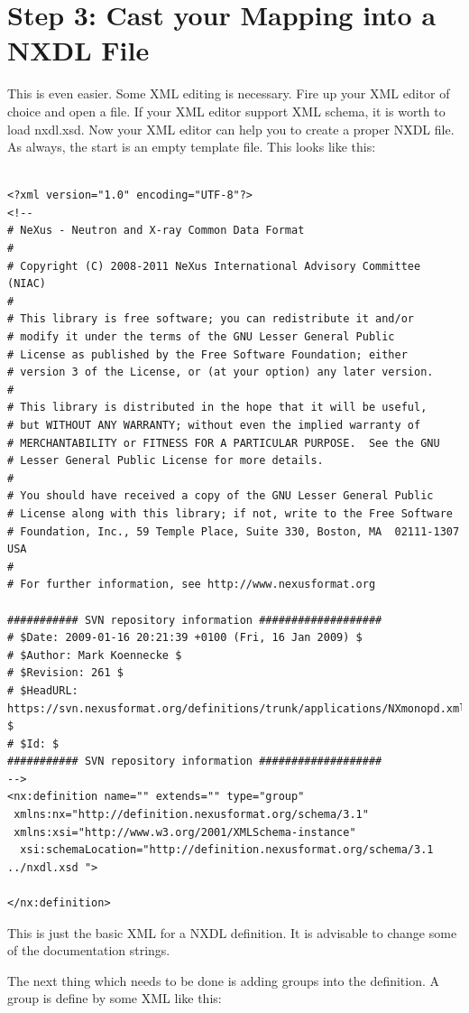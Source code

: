 \documentclass[a4paper]{article}\usepackage[dvips]{graphicx}
\begin{document}
\section{Step 3: Cast your Mapping into a NXDL File }

This is even easier. Some XML editing is necessary. Fire up your XML editor of choice and open a file. 
If your XML editor support XML schema, it is worth to load nxdl.xsd. Now your XML editor can help you to 
create a proper NXDL file. As always, the start is an empty template file. This looks like this:


\begin{verbatim}

<?xml version="1.0" encoding="UTF-8"?>
<!--
# NeXus - Neutron and X-ray Common Data Format
# 
# Copyright (C) 2008-2011 NeXus International Advisory Committee (NIAC)
# 
# This library is free software; you can redistribute it and/or
# modify it under the terms of the GNU Lesser General Public
# License as published by the Free Software Foundation; either
# version 3 of the License, or (at your option) any later version.
#
# This library is distributed in the hope that it will be useful,
# but WITHOUT ANY WARRANTY; without even the implied warranty of
# MERCHANTABILITY or FITNESS FOR A PARTICULAR PURPOSE.  See the GNU
# Lesser General Public License for more details.
#
# You should have received a copy of the GNU Lesser General Public
# License along with this library; if not, write to the Free Software
# Foundation, Inc., 59 Temple Place, Suite 330, Boston, MA  02111-1307  USA
#
# For further information, see http://www.nexusformat.org

########### SVN repository information ###################
# $Date: 2009-01-16 20:21:39 +0100 (Fri, 16 Jan 2009) $
# $Author: Mark Koennecke $
# $Revision: 261 $
# $HeadURL: https://svn.nexusformat.org/definitions/trunk/applications/NXmonopd.xml $
# $Id: $
########### SVN repository information ###################
-->
<nx:definition name="" extends="" type="group" 
 xmlns:nx="http://definition.nexusformat.org/schema/3.1" 
 xmlns:xsi="http://www.w3.org/2001/XMLSchema-instance" 
  xsi:schemaLocation="http://definition.nexusformat.org/schema/3.1 ../nxdl.xsd ">

</nx:definition>
\end{verbatim}
 
This is just the basic XML for a NXDL definition. It is advisable to change some of 
the documentation strings. 


The next thing which needs to be done is adding groups into the definition. A group is 
define by some XML like this:
\end{document}
